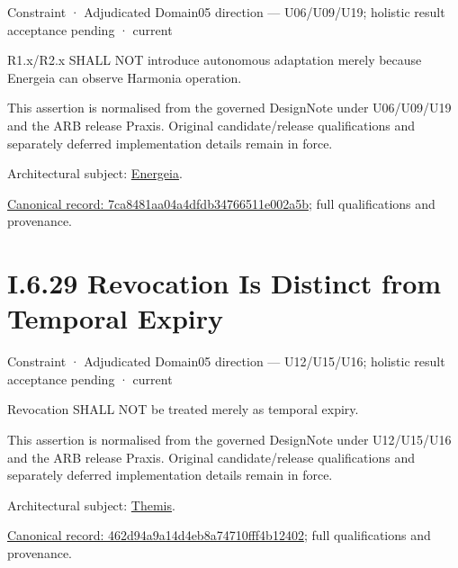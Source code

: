 \label{element:7ca8481aa04a4dfdb34766511e002a5b}
{\small Constraint · Adjudicated Domain05 direction — U06/U09/U19; holistic result acceptance pending · current}\par

R1.x/R2.x SHALL NOT introduce autonomous adaptation merely because Energeia can observe Harmonia operation.



This assertion is normalised from the governed DesignNote under U06/U09/U19 and the ARB release Praxis. Original candidate/release qualifications and separately deferred implementation details remain in force.



Architectural subject: \hyperref[element:fb3f37a6ac614415ac486a6de9d35994]{Energeia}.


{\footnotesize \href{../../../../../../../continuum/motivation/constraint/7ca8481aa04a4dfdb34766511e002a5b.md}{Canonical record: 7ca8481aa04a4dfdb34766511e002a5b}; full qualifications and provenance.}\par
\section*{I.6.29 Revocation Is Distinct from Temporal Expiry}
\label{navigation:I.6.29}

\label{element:462d94a9a14d4eb8a74710fff4b12402}
{\small Constraint · Adjudicated Domain05 direction — U12/U15/U16; holistic result acceptance pending · current}\par

Revocation SHALL NOT be treated merely as temporal expiry.



This assertion is normalised from the governed DesignNote under U12/U15/U16 and the ARB release Praxis. Original candidate/release qualifications and separately deferred implementation details remain in force.



Architectural subject: \hyperref[element:899d34ec491948b68aad09e507dea6d1]{Themis}.


{\footnotesize \href{../../../../../../../continuum/motivation/constraint/462d94a9a14d4eb8a74710fff4b12402.md}{Canonical record: 462d94a9a14d4eb8a74710fff4b12402}; full qualifications and provenance.}\par
